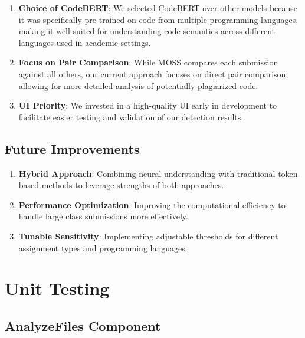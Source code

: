 \documentclass[12pt, titlepage]{article}
\begin{document}
\begin{enumerate}
    \item \textbf{Choice of CodeBERT}: We selected CodeBERT over other models because it was specifically pre-trained on code from multiple programming languages, making it well-suited for understanding code semantics across different languages used in academic settings.

    \item \textbf{Focus on Pair Comparison}: While MOSS compares each submission against all others, our current approach focuses on direct pair comparison, allowing for more detailed analysis of potentially plagiarized code.

    \item \textbf{UI Priority}: We invested in a high-quality UI early in development to facilitate easier testing and validation of our detection results.
\end{enumerate}

\subsection{Future Improvements}

\begin{enumerate}
    \item \textbf{Hybrid Approach}: Combining neural understanding with traditional token-based methods to leverage strengths of both approaches.

    \item \textbf{Performance Optimization}: Improving the computational efficiency to handle large class submissions more effectively.

    \item \textbf{Tunable Sensitivity}: Implementing adjustable thresholds for different assignment types and programming languages.
\end{enumerate}

\section{Unit Testing}
\subsection{AnalyzeFiles Component}
\end{document}
